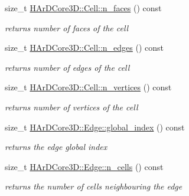 \begin{DoxyCompactItemize}
\mbox{\label{group__Mesh_ga805584b31ee6aa7f6725075d8d16a744}} 
size\+\_\+t \hyperlink{group__Mesh_ga805584b31ee6aa7f6725075d8d16a744}{H\+Ar\+D\+Core3\+D\+::\+Cell\+::n\+\_\+faces} () const
\begin{DoxyCompactList}\small\item\em returns number of faces of the cell \end{DoxyCompactList}\item 
\mbox{\label{group__Mesh_gad38d3b73d9e4aadcad92824c6a68d11b}} 
size\+\_\+t \hyperlink{group__Mesh_gad38d3b73d9e4aadcad92824c6a68d11b}{H\+Ar\+D\+Core3\+D\+::\+Cell\+::n\+\_\+edges} () const
\begin{DoxyCompactList}\small\item\em returns number of edges of the cell \end{DoxyCompactList}\item 
\mbox{\label{group__Mesh_ga48af1867fb42455b120b608083e1aebc}} 
size\+\_\+t \hyperlink{group__Mesh_ga48af1867fb42455b120b608083e1aebc}{H\+Ar\+D\+Core3\+D\+::\+Cell\+::n\+\_\+vertices} () const
\begin{DoxyCompactList}\small\item\em returns number of vertices of the cell \end{DoxyCompactList}\item 
\mbox{\label{group__Mesh_ga7460c422a7e7ed1a59bc930054551f68}} 
size\+\_\+t \hyperlink{group__Mesh_ga7460c422a7e7ed1a59bc930054551f68}{H\+Ar\+D\+Core3\+D\+::\+Edge\+::global\+\_\+index} () const
\begin{DoxyCompactList}\small\item\em returns the edge global index \end{DoxyCompactList}\item 
\mbox{\label{group__Mesh_gabe29c7660cf7a1dddb06b876ebc76f80}} 
size\+\_\+t \hyperlink{group__Mesh_gabe29c7660cf7a1dddb06b876ebc76f80}{H\+Ar\+D\+Core3\+D\+::\+Edge\+::n\+\_\+cells} () const
\begin{DoxyCompactList}\small\item\em returns the number of cells neighbouring the edge \end{DoxyCompactList}\item 
\mbox{\label{group__Mesh_gaab36400cd966cbeec90297f41c14ac55}} 

\end{DoxyCompactItemize}
